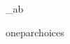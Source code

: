 \Theta  \omega  \Omega  \log_{a}b


oneparchoices

\begin{comment}


\begin{questyle}
  \question  zzz  (GATE-zzz)

  \begin{choices}
    \choice         zzz
    \choice         zzz
    \choice         zzz
    \choice         zzz
    \CorrectChoice
  \end{choices}
\end{questyle}

\begin{questyle}
  \question  zzz  (GATE-zzz)

  \begin{choices}
    \choice         zzz
    \choice         zzz
    \choice         zzz
    \choice         zzz
    \CorrectChoice
  \end{choices}
\end{questyle}

\begin{questyle}
  \question  zzz  (GATE-zzz)

  \begin{choices}
    \choice         zzz
    \choice         zzz
    \choice         zzz
    \choice         zzz
    \CorrectChoice
  \end{choices}
\end{questyle}

\begin{questyle}
  \question  zzz  (GATE-zzz)

  \begin{choices}
    \choice         zzz
    \choice         zzz
    \choice         zzz
    \choice         zzz
    \CorrectChoice
  \end{choices}
\end{questyle}

\begin{questyle}
  \question  zzz  (GATE-zzz)

  \begin{choices}
    \choice         zzz
    \choice         zzz
    \choice         zzz
    \choice         zzz
    \CorrectChoice
  \end{choices}
\end{questyle}

\begin{questyle}
  \question  zzz  (GATE-zzz)


\end{comment}

